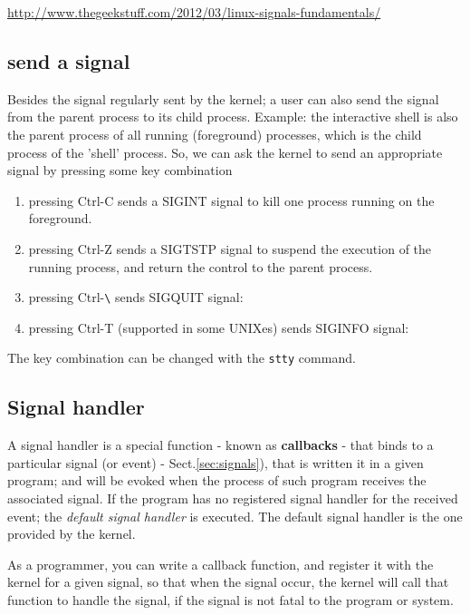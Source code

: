 \url{http://www.thegeekstuff.com/2012/03/linux-signals-fundamentals/}

\subsection{send a signal}

Besides the signal regularly sent by the kernel; a user can also send the signal
from the parent process to its child process. Example: the interactive shell is
also the parent process of all running (foreground) processes, which is the
child process of the 'shell' process. So, we can ask the kernel to send an
appropriate signal by pressing some key combination
\begin{enumerate}
  \item pressing Ctrl-C sends a SIGINT signal to kill one process running on the
  foreground.
 
  \item pressing Ctrl-Z sends a SIGTSTP signal to suspend the execution of the
  running process, and return the control to the parent process.
  
  \item pressing Ctrl-\verb!\! sends SIGQUIT signal: 
  
  \item pressing Ctrl-T (supported in some UNIXes) sends SIGINFO signal: 
\end{enumerate} 
The key combination can be changed with the \verb!stty! command.

\subsection{Signal handler}
\label{sec:signal_handler}

A signal handler is a special function - known as {\bf callbacks} - that binds
to a particular signal (or event) - Sect.\ref{sec:signals}), that is written it
in a given program; and will be evoked when the process of such program receives
the associated signal.
If the program has no registered signal handler for the received event; the {\it
default signal handler} is executed. The default signal handler is the one
provided by the kernel.

As a programmer, you can write a callback function, and register it with the
kernel for a given signal, so that when the signal occur, the kernel will call
that function to handle the signal, if the signal is not fatal to the program or
system.

